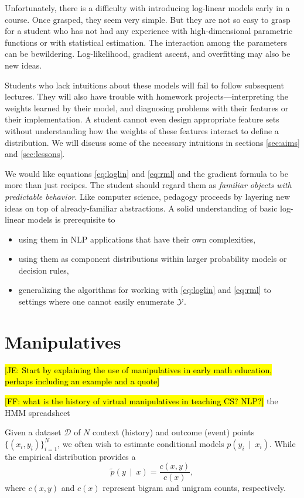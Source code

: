\documentclass[11pt,letterpaper]{article}
\newcommand{\Note}[1]{}
\renewcommand{\Note}[1]{\hl{[#1]}}
\newcommand{\NoteSigned}[3]{{\sethlcolor{#2}\Note{#1: #3}}}
\newcommand{\NoteFF}[1]{\NoteSigned{FF}{LightBlue}{#1}}
\newcommand{\NoteJE}[1]{\NoteSigned{JE}{LightGreen}{#1}}
\newcommand{\empirical}[0]{\ensuremath{\tilde{p}}}
\newcommand{\Data}[0]{\ensuremath{\mathcal{D}}}
\begin{document}
Unfortunately, there is a difficulty with introducing log-linear
models early in a course.  Once grasped, they seem very simple.  But
they are not so easy to grasp for a student who has not had any
experience with high-dimensional parametric functions or with
statistical estimation.  The interaction among the parameters can be
bewildering.  Log-likelihood, gradient ascent, and overfitting may also
be new ideas.

Students who lack intuitions about these models will fail to follow
subsequent lectures.  They will also have trouble with homework
projects---interpreting the weights learned by their model, and
diagnosing problems with their features or their implementation.  A
student cannot even design appropriate feature sets without
understanding how the weights of these features interact to define a
distribution.  We will discuss some of the necessary intuitions in
sections \ref{sec:aims} and \ref{sec:lessons}.

We would like equations \eqref{eq:loglin} and \eqref{eq:rml} and the
gradient formula to be more than just recipes.  The student should
regard them as {\em familiar objects with predictable behavior}.  Like
computer science, pedagogy proceeds by layering new ideas on top of
already-familiar abstractions.  A solid understanding of basic
log-linear models is prerequisite to 
\begin{itemize}
\item using them in NLP applications that have their own complexities, 
\item using them as component distributions within larger probability
  models or decision rules,
\item generalizing the algorithms for working with \eqref{eq:loglin}
  and \eqref{eq:rml} to settings where one cannot easily enumerate
  ${\cal Y}$.
\end{itemize}

\section{Manipulatives}

\NoteJE{Start by explaining the use of manipulatives in early math
  education, perhaps including an example and a quote}

\NoteFF{what is the history of virtual manipulatives in teaching CS? NLP?} the HMM spreadsheet \cite{eisner-2002-tnlp}



Given a dataset \Data{} of $N$ context (history) and outcome (event) points $\{( x_i, y_i)\}_{i=1}^N$, we often wish to  estimate conditional models $p(y_i\ \mid\ x_i)$. While the empirical distribution provides a 
\begin{equation}
\empirical\left(y\ \mid\ x\right) = \frac{c(x,y)}{c(x)},
\label{eqn:empirical_distr}
\end{equation}
where $c(x,y)$ and $c(x)$ represent bigram and unigram counts, respectively.
\end{document}
